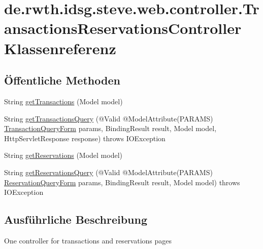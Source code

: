 \hypertarget{classde_1_1rwth_1_1idsg_1_1steve_1_1web_1_1controller_1_1_transactions_reservations_controller}{\section{de.\-rwth.\-idsg.\-steve.\-web.\-controller.\-Transactions\-Reservations\-Controller Klassenreferenz}
\label{classde_1_1rwth_1_1idsg_1_1steve_1_1web_1_1controller_1_1_transactions_reservations_controller}
}
\subsection*{Öffentliche Methoden}
\begin{DoxyCompactItemize}
\item 
String \hyperlink{classde_1_1rwth_1_1idsg_1_1steve_1_1web_1_1controller_1_1_transactions_reservations_controller_a42144a8bc58a5218fab8801fd51d8a84}{get\-Transactions} (Model model)
\item 
String \hyperlink{classde_1_1rwth_1_1idsg_1_1steve_1_1web_1_1controller_1_1_transactions_reservations_controller_a0f696bf2623ea8e0122658f57b1c8cd6}{get\-Transactions\-Query} (@Valid @Model\-Attribute(P\-A\-R\-A\-M\-S) \hyperlink{classde_1_1rwth_1_1idsg_1_1steve_1_1web_1_1dto_1_1_transaction_query_form}{Transaction\-Query\-Form} params, Binding\-Result result, Model model, Http\-Servlet\-Response response)  throws I\-O\-Exception 
\item 
String \hyperlink{classde_1_1rwth_1_1idsg_1_1steve_1_1web_1_1controller_1_1_transactions_reservations_controller_ac8daf8c168895eebe5468e986e835302}{get\-Reservations} (Model model)
\item 
String \hyperlink{classde_1_1rwth_1_1idsg_1_1steve_1_1web_1_1controller_1_1_transactions_reservations_controller_a9b84389465183c96673f0a2d2372aab2}{get\-Reservations\-Query} (@Valid @Model\-Attribute(P\-A\-R\-A\-M\-S) \hyperlink{classde_1_1rwth_1_1idsg_1_1steve_1_1web_1_1dto_1_1_reservation_query_form}{Reservation\-Query\-Form} params, Binding\-Result result, Model model)  throws I\-O\-Exception 
\end{DoxyCompactItemize}


\subsection{Ausführliche Beschreibung}
One controller for transactions and reservations pages


